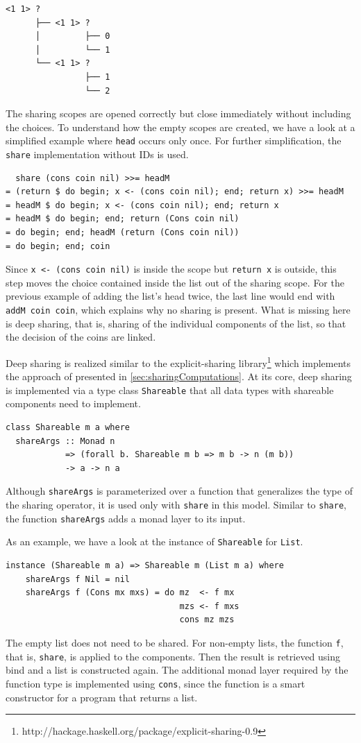 \documentclass[a4paper, 11pt, fleqn, twoside, abstract=on]{scrreprt}
\newcommand{\hinl}[1]{\texttt{#1}}
\begin{document}
\begin{verbatim}
<1 1> ? 
      ├── <1 1> ? 
      │         ├── 0
      │         └── 1
      └── <1 1> ? 
                ├── 1
                └── 2
\end{verbatim}
\noindent
The sharing scopes are opened correctly but close immediately without including the choices.
To understand how the empty scopes are created, we have a look at a simplified example where \hinl{head} occurs only once.
For further simplification, the \hinl{share} implementation without IDs is used.

\begin{verbatim}
  share (cons coin nil) >>= headM
= (return $ do begin; x <- (cons coin nil); end; return x) >>= headM
= headM $ do begin; x <- (cons coin nil); end; return x
= headM $ do begin; end; return (Cons coin nil)
= do begin; end; headM (return (Cons coin nil))
= do begin; end; coin
\end{verbatim}
\noindent
Since \hinl{x <- (cons coin nil)} is inside the scope but \hinl{return x} is outside, this step moves the choice contained inside the list out of the sharing scope.
For the previous example of adding the list's head twice, the last line would end with \hinl{addM coin coin}, which explains why no sharing is present.
What is missing here is deep sharing, that is, sharing of the individual components of the list, so that the decision of the coins are linked.

Deep sharing is realized similar to the explicit-sharing library\footnote{http://hackage.haskell.org/package/explicit-sharing-0.9} which implements the approach of \citep{fischer2009purely} presented in \autoref{sec:sharingComputations}.
At its core, deep sharing is implemented via a type class \hinl{Shareable} that all data types with shareable components need to implement.

\begin{verbatim}
class Shareable m a where
  shareArgs :: Monad n 
            => (forall b. Shareable m b => m b -> n (m b))
            -> a -> n a
\end{verbatim}
\noindent
Although \hinl{shareArgs} is parameterized over a function that generalizes the type of the sharing operator, it is used only with \hinl{share} in this model.
Similar to \hinl{share}, the function \hinl{shareArgs} adds a monad layer to its input.

As an example, we have a look at the instance of \hinl{Shareable} for \hinl{List}.

\begin{verbatim}
instance (Shareable m a) => Shareable m (List m a) where
    shareArgs f Nil = nil
    shareArgs f (Cons mx mxs) = do mz  <- f mx
                                   mzs <- f mxs
                                   cons mz mzs
\end{verbatim}
\noindent
The empty list does not need to be shared.
For non-empty lists, the function \hinl{f}, that is, \hinl{share}, is applied to the components.
Then the result is retrieved using bind and a list is constructed again.
The additional monad layer required by the function type is implemented using \hinl{cons}, since the function is a smart constructor for a program that returns a list.
\end{document}
